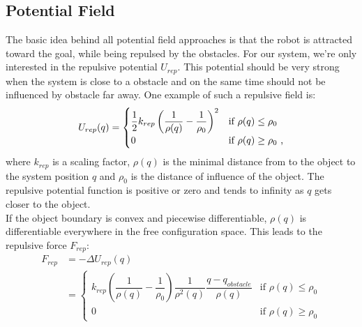 \subsection{Potential Field}
\label{subs:potential field}
The basic idea behind all potential field approaches is that the robot is attracted toward the goal, while being repulsed by the obstacles. For our system, we're only interested in the repulsive potential $U_{rep}$. This potential should be very strong when the system is close to a obstacle and on the same time should not be influenced by obstacle far away. One example of such a repulsive field is:
\begin{equation}
\label{eq:pot field}
\centering
U_{rep}(q)=\begin{cases}
\dfrac{1}{2}k_{rep}\left(\dfrac{1}{\rho (q)}-\dfrac{1}{\rho_0}\right)^2 & \text{if } \rho(q)\leq\rho_0 \\
0 & \text{if } \rho(q)\geq\rho_0 \text{ ,}
\end{cases}
\end{equation}
where $k_{rep}$ is a scaling factor, $\rho(q)$ is the minimal distance from to the object to the system position $q$ and $\rho_0$ is the distance of influence of the object. The repulsive potential function is positive or zero and tends to infinity as $q$ gets closer to the object.\\
If the object boundary is convex and piecewise differentiable, $\rho(q)$ is differentiable everywhere in the free configuration space. This leads to the repulsive force $F_{rep}$:
\begin{equation}
\begin{split}
F_{rep} &=-\Delta U_{rep}(q)\\
&=	\begin{cases}
k_{rep}\left(\dfrac{1}{\rho(q)}-\dfrac{1}{\rho_0}\right)\dfrac{1}{\rho^2(q)}\dfrac{q-q_{obstacle}}{\rho(q)} & \text{if }\rho(q)\leq\rho_0\\
0 & \text{if }\rho(q)\geq\rho_0
\end{cases}
\end{split}
\end{equation}

